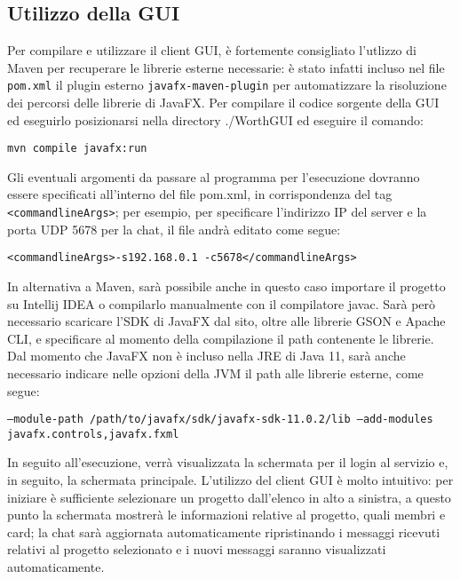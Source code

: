 \documentclass{article}
\begin{document}
\subsection{Utilizzo della GUI}
Per compilare e utilizzare il client GUI, è fortemente consigliato l'utlizzo di Maven per recuperare le librerie esterne necessarie: è stato infatti incluso nel file \texttt{pom.xml} il plugin esterno \texttt{javafx-maven-plugin} per automatizzare la risoluzione dei percorsi delle librerie di JavaFX. 
Per compilare il codice sorgente della GUI ed eseguirlo posizionarsi nella directory ./WorthGUI ed eseguire il comando:
\begin{center}
    \texttt{mvn compile javafx:run}
\end{center}
Gli eventuali argomenti da passare al programma per l'esecuzione dovranno essere specificati all'interno del file pom.xml, in corrispondenza del tag \texttt{<commandlineArgs>}; per esempio, per specificare l'indirizzo IP del server e la porta UDP 5678 per la chat, il file andrà editato come segue:
\begin{center}
    \texttt{<commandlineArgs>-s192.168.0.1 -c5678</commandlineArgs>}
\end{center}
In alternativa a Maven, sarà possibile anche in questo caso importare il progetto su Intellij IDEA o compilarlo manualmente con il compilatore javac. Sarà però necessario scaricare l'SDK di JavaFX dal sito, oltre alle librerie GSON e Apache CLI, e specificare al momento della compilazione il path contenente le librerie. Dal momento che JavaFX non è incluso nella JRE di Java 11, sarà anche necessario indicare nelle opzioni della JVM il path alle librerie esterne, come segue: 
\begin{center}
\texttt{--module-path /path/to/javafx/sdk/javafx-sdk-11.0.2/lib --add-modules javafx.controls,javafx.fxml}
\end{center}
In seguito all'esecuzione, verrà visualizzata la schermata per il login al servizio e, in seguito, la schermata principale.
L'utilizzo del client GUI è molto intuitivo: per iniziare è sufficiente selezionare un progetto dall'elenco in alto a sinistra, a questo punto la schermata mostrerà le informazioni relative al progetto, quali membri e card; la chat sarà aggiornata automaticamente ripristinando i messaggi ricevuti relativi al progetto selezionato e i nuovi messaggi saranno visualizzati automaticamente.
\end{document}
